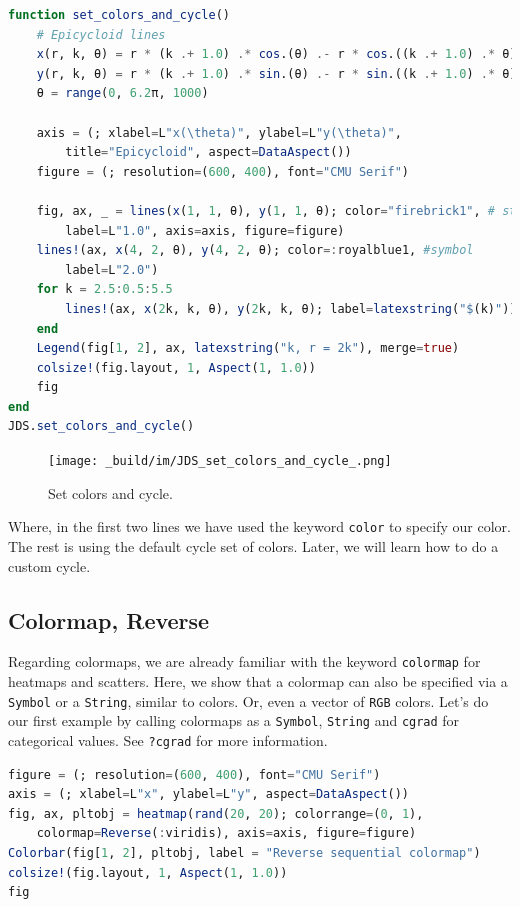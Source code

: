 \documentclass[
  notoc %
]{tufte-book}
\newcommand{\passthrough}[1]{#1}
\begin{document}
\begin{lstlisting}[language=Julia]
function set_colors_and_cycle()
    # Epicycloid lines
    x(r, k, θ) = r * (k .+ 1.0) .* cos.(θ) .- r * cos.((k .+ 1.0) .* θ)
    y(r, k, θ) = r * (k .+ 1.0) .* sin.(θ) .- r * sin.((k .+ 1.0) .* θ)
    θ = range(0, 6.2π, 1000)

    axis = (; xlabel=L"x(\theta)", ylabel=L"y(\theta)",
        title="Epicycloid", aspect=DataAspect())
    figure = (; resolution=(600, 400), font="CMU Serif")

    fig, ax, _ = lines(x(1, 1, θ), y(1, 1, θ); color="firebrick1", # string
        label=L"1.0", axis=axis, figure=figure)
    lines!(ax, x(4, 2, θ), y(4, 2, θ); color=:royalblue1, #symbol
        label=L"2.0")
    for k = 2.5:0.5:5.5
        lines!(ax, x(2k, k, θ), y(2k, k, θ); label=latexstring("$(k)")) #cycle
    end
    Legend(fig[1, 2], ax, latexstring("k, r = 2k"), merge=true)
    colsize!(fig.layout, 1, Aspect(1, 1.0))
    fig
end
JDS.set_colors_and_cycle()
\end{lstlisting}

\begin{figure}
\hypertarget{fig:set_colors_and_cycle}{%
\centering
\texttt{[image: \_build/im/JDS\_set\_colors\_and\_cycle\_.png]}
\caption{Set colors and cycle.}\label{fig:set_colors_and_cycle}
}
\end{figure}

Where, in the first two lines we have used the keyword
\passthrough{\lstinline!color!} to specify our color. The rest is using
the default cycle set of colors. Later, we will learn how to do a custom
cycle.

\hypertarget{colormap-reverse}{%
\subsection{Colormap, Reverse}\label{colormap-reverse}}

Regarding colormaps, we are already familiar with the keyword
\passthrough{\lstinline!colormap!} for heatmaps and scatters. Here, we
show that a colormap can also be specified via a
\passthrough{\lstinline!Symbol!} or a \passthrough{\lstinline!String!},
similar to colors. Or, even a vector of \passthrough{\lstinline!RGB!}
colors. Let's do our first example by calling colormaps as a
\passthrough{\lstinline!Symbol!}, \passthrough{\lstinline!String!} and
\passthrough{\lstinline!cgrad!} for categorical values. See
\passthrough{\lstinline!?cgrad!} for more information.

\begin{lstlisting}[language=Julia]
figure = (; resolution=(600, 400), font="CMU Serif")
axis = (; xlabel=L"x", ylabel=L"y", aspect=DataAspect())
fig, ax, pltobj = heatmap(rand(20, 20); colorrange=(0, 1),
    colormap=Reverse(:viridis), axis=axis, figure=figure)
Colorbar(fig[1, 2], pltobj, label = "Reverse sequential colormap")
colsize!(fig.layout, 1, Aspect(1, 1.0))
fig
\end{lstlisting}
\end{document}
